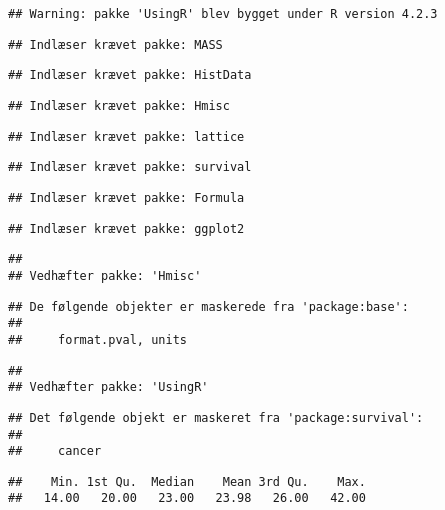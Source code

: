 \documentclass[
]{article}
\begin{document}
\begin{verbatim}
## Warning: pakke 'UsingR' blev bygget under R version 4.2.3
\end{verbatim}

\begin{verbatim}
## Indlæser krævet pakke: MASS
\end{verbatim}

\begin{verbatim}
## Indlæser krævet pakke: HistData
\end{verbatim}

\begin{verbatim}
## Indlæser krævet pakke: Hmisc
\end{verbatim}

\begin{verbatim}
## Indlæser krævet pakke: lattice
\end{verbatim}

\begin{verbatim}
## Indlæser krævet pakke: survival
\end{verbatim}

\begin{verbatim}
## Indlæser krævet pakke: Formula
\end{verbatim}

\begin{verbatim}
## Indlæser krævet pakke: ggplot2
\end{verbatim}

\begin{verbatim}
## 
## Vedhæfter pakke: 'Hmisc'
\end{verbatim}

\begin{verbatim}
## De følgende objekter er maskerede fra 'package:base':
## 
##     format.pval, units
\end{verbatim}

\begin{verbatim}
## 
## Vedhæfter pakke: 'UsingR'
\end{verbatim}

\begin{verbatim}
## Det følgende objekt er maskeret fra 'package:survival':
## 
##     cancer
\end{verbatim}

\begin{verbatim}
##    Min. 1st Qu.  Median    Mean 3rd Qu.    Max. 
##   14.00   20.00   23.00   23.98   26.00   42.00
\end{verbatim}
\end{document}
